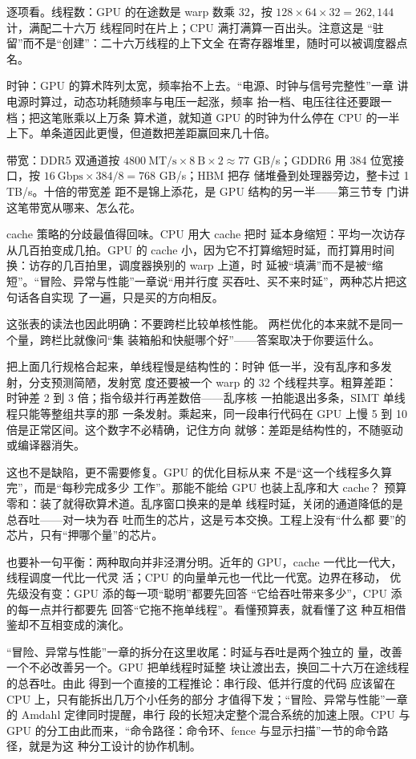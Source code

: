 逐项看。线程数：GPU 的在途数是 warp 数乘 32，按
$128\times64\times32=262,144$ 计，满配二十六万
线程同时在片上；CPU 满打满算一百出头。注意这是
“驻留”而不是“创建”：二十六万线程的上下文全
在寄存器堆里，随时可以被调度器点名。

时钟：GPU 的算术阵列太宽，频率抬不上去。“电源、时钟与信号完整性”一章
讲电源时算过，动态功耗随频率与电压一起涨，频率
抬一档、电压往往还要跟一档；把这笔账乘以上万条
算术道，就知道 GPU 的时钟为什么停在 CPU 的一半
上下。单条道因此更慢，但道数把差距赢回来几十倍。

带宽：DDR5 双通道按
$4800\ \text{MT/s}\times8\ \text{B}\times2\approx77$
GB/s；GDDR6 用 384 位宽接口，按
$16\ \text{Gbps}\times384/8=768$ GB/s；HBM 把存
储堆叠到处理器旁边，整卡过 1 TB/s。十倍的带宽差
距不是锦上添花，是 GPU 结构的另一半——第三节专
门讲这笔带宽从哪来、怎么花。

cache 策略的分歧最值得回味。CPU 用大 cache 把时
延本身缩短：平均一次访存从几百拍变成几拍。GPU
的 cache 小，因为它不打算缩短时延，而打算用时间
换：访存的几百拍里，调度器换别的 warp 上道，时
延被“填满”而不是被“缩短”。“冒险、异常与性能”一章说“用并行度
买吞吐、买不来时延”，两种芯片把这句话各自实现
了一遍，只是买的方向相反。

这张表的读法也因此明确：不要跨栏比较单核性能。
两栏优化的本来就不是同一个量，跨栏比就像问“集
装箱船和快艇哪个好”——答案取决于你要运什么。

把上面几行规格合起来，单线程慢是结构性的：时钟
低一半，没有乱序和多发射，分支预测简陋，发射宽
度还要被一个 warp 的 32 个线程共享。粗算差距：
时钟差 2 到 3 倍；指令级并行再差数倍——乱序核
一拍能退出多条，SIMT 单线程只能等整组共享的那
一条发射。乘起来，同一段串行代码在 GPU 上慢 5
到 10 倍是正常区间。这个数字不必精确，记住方向
就够：差距是结构性的，不随驱动或编译器消失。

这也不是缺陷，更不需要修复。GPU 的优化目标从来
不是“这一个线程多久算完”，而是“每秒完成多少
工作”。那能不能给 GPU 也装上乱序和大 cache？
预算零和：装了就得砍算术道。乱序窗口换来的是单
线程时延，关闭的通道降低的是总吞吐——对一块为吞
吐而生的芯片，这是亏本交换。工程上没有“什么都
要”的芯片，只有“押哪个量”的芯片。

也要补一句平衡：两种取向并非泾渭分明。近年的
GPU，cache 一代比一代大，线程调度一代比一代灵
活；CPU 的向量单元也一代比一代宽。边界在移动，
优先级没有变：GPU 添的每一项“聪明”都要先回答
“它给吞吐带来多少”，CPU 添的每一点并行都要先
回答“它拖不拖单线程”。看懂预算表，就看懂了这
种互相借鉴却不互相变成的演化。

“冒险、异常与性能”一章的拆分在这里收尾：时延与吞吐是两个独立的
量，改善一个不必改善另一个。GPU 把单线程时延整
块让渡出去，换回二十六万在途线程的总吞吐。由此
得到一个直接的工程推论：串行段、低并行度的代码
应该留在 CPU 上，只有能拆出几万个小任务的部分
才值得下发；“冒险、异常与性能”一章的 Amdahl 定律同时提醒，串行
段的长短决定整个混合系统的加速上限。CPU 与 GPU
的分工由此而来，“命令路径：命令环、fence 与显示扫描”一节的命令路径，就是为这
种分工设计的协作机制。

